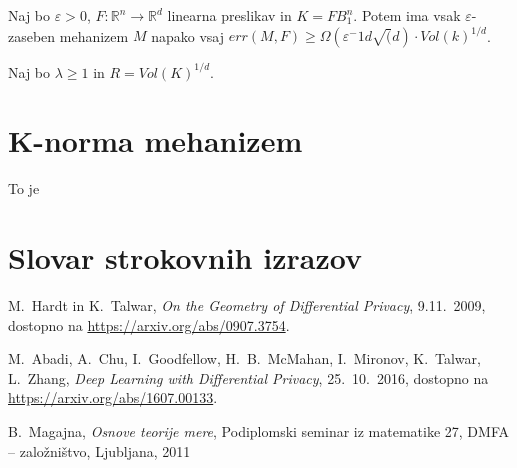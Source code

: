 \documentclass[mat1]{fmfdelo}
\newcommand{\R}{\mathbb R}
\newcommand{\query}{F: \R^n \to \R^d}
\begin{document}
\begin{izrek}
	Naj bo $\varepsilon > 0$, $\query$ linearna preslikav in $K=FB_1^n$. Potem ima vsak $\varepsilon$-zaseben mehanizem $M$ napako vsaj $err(M,F) \geq \Omega(\varepsilon^-1 d \sqrt(d) \cdot Vol(k)^{1/d}$.
\end{izrek}

\begin{dokaz}
	Naj bo $\lambda \geq 1$ in $R=Vol(K)^{1/d}$. 	
\end{dokaz}

\section{K-norma mehanizem}

To je 



\section*{Slovar strokovnih izrazov}


\begin{thebibliography}{99}

M.~Hardt in K.~Talwar, \emph{On the Geometry of Differential Privacy}, 9.11.~2009, dostopno na \url{https://arxiv.org/abs/0907.3754}.

M.~Abadi, A.~Chu, I.~Goodfellow, H.~B.~McMahan, I.~Mironov, K.~Talwar, L.~Zhang, \emph{Deep Learning with Differential Privacy}, 25.~10.~2016, dostopno na \url{https://arxiv.org/abs/1607.00133}.

B.~Magajna, \emph{Osnove teorije mere}, Podiplomski seminar iz matematike 27, DMFA -- založništvo, Ljubljana, 2011


\end{thebibliography}
\end{document}
